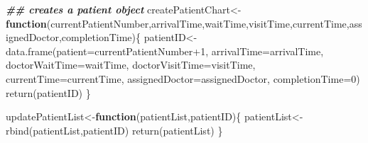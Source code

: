 \documentclass[
]{book}
\newenvironment{Shaded}{\begin{snugshade}}{\end{snugshade}}
\newcommand{\AttributeTok}[1]{\textcolor[rgb]{0.77,0.63,0.00}{#1}}
\newcommand{\ControlFlowTok}[1]{\textcolor[rgb]{0.13,0.29,0.53}{\textbf{#1}}}
\newcommand{\DecValTok}[1]{\textcolor[rgb]{0.00,0.00,0.81}{#1}}
\newcommand{\DocumentationTok}[1]{\textcolor[rgb]{0.56,0.35,0.01}{\textbf{\textit{#1}}}}
\newcommand{\FunctionTok}[1]{\textcolor[rgb]{0.00,0.00,0.00}{#1}}
\newcommand{\NormalTok}[1]{#1}
\newcommand{\OtherTok}[1]{\textcolor[rgb]{0.56,0.35,0.01}{#1}}
\newcommand{\SpecialCharTok}[1]{\textcolor[rgb]{0.00,0.00,0.00}{#1}}
\theoremstyle{definition}
\theoremstyle{definition}
\theoremstyle{definition}
\theoremstyle{definition}
\theoremstyle{remark}
\begin{document}
\begin{Shaded}
\begin{Highlighting}[]
 
 \DocumentationTok{\#\# creates a patient object}
\NormalTok{ createPatientChart}\OtherTok{\textless{}{-}}\ControlFlowTok{function}\NormalTok{(currentPatientNumber,arrivalTime,waitTime,visitTime,currentTime,assignedDoctor,completionTime)\{}
\NormalTok{   patientID}\OtherTok{\textless{}{-}}\FunctionTok{data.frame}\NormalTok{(}\AttributeTok{patient=}\NormalTok{currentPatientNumber}\SpecialCharTok{+}\DecValTok{1}\NormalTok{,}
                         \AttributeTok{arrivalTime=}\NormalTok{arrivalTime,}
                         \AttributeTok{doctorWaitTime=}\NormalTok{waitTime,}
                         \AttributeTok{doctorVisitTime=}\NormalTok{visitTime,}
                         \AttributeTok{currentTime=}\NormalTok{currentTime,}
                         \AttributeTok{assignedDoctor=}\NormalTok{assignedDoctor,}
                         \AttributeTok{completionTime=}\DecValTok{0}\NormalTok{)}
   \FunctionTok{return}\NormalTok{(patientID)}
\NormalTok{ \}}
 
\NormalTok{ updatePatientList}\OtherTok{\textless{}{-}}\ControlFlowTok{function}\NormalTok{(patientList,patientID)\{}
\NormalTok{   patientList}\OtherTok{\textless{}{-}}\FunctionTok{rbind}\NormalTok{(patientList,patientID)}
   \FunctionTok{return}\NormalTok{(patientList)}
\NormalTok{ \}}
 

\end{Highlighting}
\end{Shaded}
\end{document}
